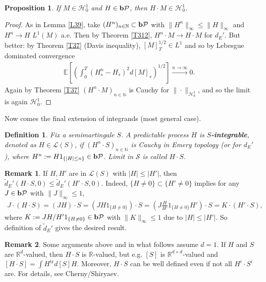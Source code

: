 \documentclass[12pt,a4paper, twoside]{article}
\newtheorem{prop}{Proposition}[section]
\newtheorem{defn}{Definition}[section]
\theoremstyle{definition}
\newtheorem{rem}{Remark}[section]
\newcommand{\EE}{\mathbb{E}} %
\newcommand{\pred}{\textbf{\text{b}}\mathcal{P}}
\begin{document}
\begin{prop} \label{P314} If $M \in \mathcal{H}_0^1$ and $H \in \pred$, then $H \cdot M \in \mathcal{H}_0^1$. 
\end{prop}
\begin{proof}
As in Lemma \ref{L39}, take $(H^n)_{n \in \mathbb{N}} \subset \pred$ with $\|H^n\|_\infty \leq \|H\|_\infty$ and $H^n \to H$ $L^1(M)$ a.e. Then by Theorem \ref{T312}, $H^n \cdot M \to H \cdot M$ for $d_E'$. But better: by Theorem \ref{T37} (Davis inequality), $[M]_T^{1/2} \in L^1$ and so by Lebesgue dominated convergence 
\begin{align*}
\EE \left[ \left( \int_0^T (H_s^n-H_s)^2 d [M]_s \right)^{1/2} \right] \xrightarrow{n \to \infty} 0. 
\end{align*}
Again by Theorem \ref{T37} $(H^n \cdot M)_{n \in \mathbb{N}}$ is Cauchy for $\| \cdot \|_{ \mathcal{H}_0^1 }$, and so the limit is again $\mathcal{H}_0^1$. 
\end{proof}
Now comes the final extension of integrands (most general case). 
\begin{defn} Fix a semimartingale $S$. A predictable process $H$ is \textbf{$S$-integrable}, denoted as $H \in \mathcal{L}(S)$, if $(H^n \cdot S)_{n \in \mathbb{N}}$ is Cauchy in Emery topology (or for $d_E'$), where $H^n:= H 1_{\{ |H| \leq n\}} \in \pred$. Limit in $\mathcal{S}$ is called $H \cdot S$. 
\end{defn}
\begin{rem} \label{rem1} If $H,H'$ are in $\mathcal{L}(S)$ with $|H| \leq |H'|$, then $\widetilde{d}_E'(H \cdot S, 0) \leq \widetilde{d}_E'(H' \cdot S, 0)$. Indeed, $ \{ H \neq 0 \} \subset \{ H' \neq 0 \}$ implies for any $J \in \pred$ with $\|J\|_\infty \leq 1$, 
\begin{align*}
J \cdot (H \cdot S)= (JH) \cdot S = (JH 1_{\{ H \neq 0\}}) \cdot S =  \left( J \frac{H}{H'}1_{\{ H \neq 0 \}} H' \right) \cdot S = K \cdot (H' \cdot S),
\end{align*}
where $K:= J H/H' 1_{\{ H \neq 0\}} \in \pred$ with $\|K \|_\infty \leq 1$ due to $|H| \leq |H'|$. So definition of $\widetilde{d}_E'$ gives the desired result.
\end{rem}
\begin{rem}Some arguments above and in what follows assume $d=1$. If $H$ and $S$ are $\mathbb{R}^d$-valued, then $H \cdot S$ is $\mathbb{R}$-valued, but e.g. $[S]$ is $\mathbb{R}^{d \times d}$-valued and $[H \cdot S] = \int H^\text{tr} d[S]H.$ Moreover, $H \cdot S$ can be well defined even if not all $H^i \cdot S^i$ are. For details, see Cherny/Shiryaev. 
\end{rem}
\end{document}
